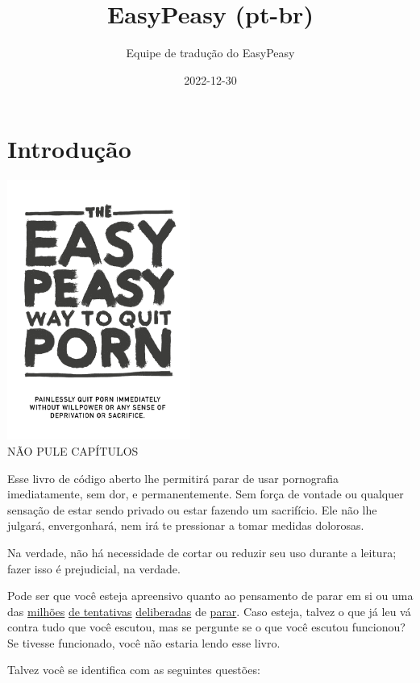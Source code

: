 \documentclass[
  spanish,
  openany]{book}
\title{EasyPeasy (pt-br)}
\author{Equipe de tradução do EasyPeasy}
\date{2022-12-30}
\let\oldhref\href
\renewcommand{\href}[2]{\textcolor{linkcolor}{\oldhref{#1}{#2}}}
\begin{document}
\maketitle

{
\setcounter{tocdepth}{1}
\tableofcontents
}
\hypertarget{introducao}{%
\chapter{Introdução}\label{introducao}}

\includegraphics[width=0.45\textwidth,height=0.45\textheight]{img-cover.jpg}\\

{NÃO PULE CAPÍTULOS}

Esse livro de código aberto lhe permitirá parar de usar pornografia imediatamente, sem dor, e permanentemente. Sem força de vontade ou qualquer sensação de estar sendo privado ou estar fazendo um sacrifício. Ele não lhe julgará, envergonhará, nem irá te pressionar a tomar medidas dolorosas.

Na verdade, não há necessidade de cortar ou reduzir seu uso durante a leitura; fazer isso é prejudicial, na verdade.

Pode ser que você esteja apreensivo quanto ao pensamento de parar em si ou uma das \href{https://old.reddit.com/r/nofap}{milhões} \href{https://rebootnation.org/}{de tentativas} \href{https://old.reddit.com/r/pornfree}{deliberadas} de \href{https://yourbrainrebalanced.com/}{parar}. Caso esteja, talvez o que já leu vá contra tudo que você escutou, mas se pergunte se o que você escutou funcionou? Se tivesse funcionado, você não estaria lendo esse livro.

Talvez você se identifica com as seguintes questões:
\end{document}
